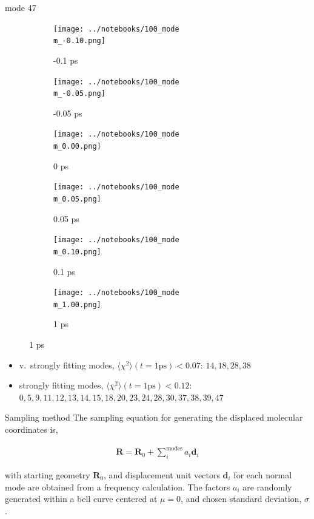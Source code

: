 \documentclass{beamer}
\begin{document}
\renewcommand\m{47}
\begin{frame}{mode \m}
	\begin{figure}
		\centering
		\begin{subfigure}[b]{\w\textwidth}
			\centering
			\texttt{[image: ../notebooks/100\_mode\\m\_-0.10.png]}
			\caption{-0.1 ps}
		\end{subfigure}
		\begin{subfigure}[b]{\w\textwidth}
			\centering
			\texttt{[image: ../notebooks/100\_mode\\m\_-0.05.png]}
			\caption{-0.05 ps}
		\end{subfigure}
		\begin{subfigure}[b]{\w\textwidth}
			\centering
			\texttt{[image: ../notebooks/100\_mode\\m\_0.00.png]}
			\caption{0 ps}
		\end{subfigure}
		\begin{subfigure}[b]{\w\textwidth}
			\centering
			\texttt{[image: ../notebooks/100\_mode\\m\_0.05.png]}
			\caption{0.05 ps}
		\end{subfigure}
		\begin{subfigure}[b]{\w\textwidth}
			\centering
			\texttt{[image: ../notebooks/100\_mode\\m\_0.10.png]}
			\caption{0.1 ps}
		\end{subfigure}
		\begin{subfigure}[b]{\w\textwidth}
			\centering
			\texttt{[image: ../notebooks/100\_mode\\m\_1.00.png]}
			\caption{1 ps}
		\end{subfigure}
	\end{figure}
\end{frame}

\begin{frame}
	\begin{itemize}
		\item v.\ strongly fitting modes, $\langle\chi^2\rangle(t = 1 \textrm{ps}) < 0.07$: $14,18,28,38$
		\item strongly fitting modes, $\langle\chi^2\rangle(t = 1 \textrm{ps}) < 0.12$: $0,5,9,11,12,13,14,15,18,20,23,24,28,30,37,38,39,47$
	\end{itemize}
\end{frame}

\begin{frame}{Sampling method}
The sampling equation for generating the displaced molecular coordinates is,

\begin{eqnarray}
\textbf{R} = \textbf{R}_0 + \sum_i^{\textrm{modes}} a_i\textbf{d}_i
\end{eqnarray}

with starting geometry $\textbf{R}_0$, and displacement unit vectors $\textbf{d}_i$ for each normal mode are obtained from a frequency calculation.  The factors $a_i$ are randomly generated within a bell curve centered at $\mu=0$, and chosen standard deviation, $\sigma$. 
\end{frame}
\end{document}
